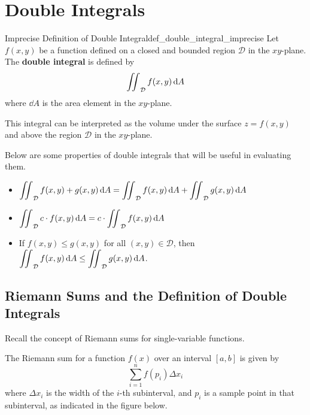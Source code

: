 \section{Double Integrals}
\begin{definition}{Imprecise Definition of Double Integral}{def_double_integral_imprecise}
Let $f(x, y)$ be a function defined on a closed and bounded region $\mathcal{D}$ in the $xy$-plane.
The \textbf{double integral} is defined by
\[
    \mathop{\int\mkern-10mu\int}\nolimits_{\mathcal{D}} f(x, y) \, \mathrm{d}A
\]
where $\dd{A}$ is the area element in the $xy$-plane.

This integral can be interpreted as the volume under the surface $z = f(x, y)$ and above the region $\mathcal{D}$ in the $xy$-plane.
\end{definition}

Below are some properties of double integrals that will be useful in evaluating them.
\begin{itemize}
    \item $\displaystyle\mathop{\int\mkern-10mu\int}\nolimits_{\mathcal{D}} f(x, y) + g(x, y) \, \mathrm{d}A = \mathop{\int\mkern-10mu\int}\nolimits_{\mathcal{D}} f(x, y) \, \mathrm{d}A + \mathop{\int\mkern-10mu\int}\nolimits_{\mathcal{D}} g(x, y) \, \mathrm{d}A$ \\[-0.5em]
    \item $\displaystyle\mathop{\int\mkern-10mu\int}\nolimits_{\mathcal{D}} c \cdot f(x, y) \, \mathrm{d}A = c \cdot \mathop{\int\mkern-10mu\int}\nolimits_{\mathcal{D}} f(x, y) \, \mathrm{d}A$ \\[-0.5em]
    \item If $f(x, y) \leq g(x, y)$ for all $(x, y) \in \mathcal{D}$, then $\displaystyle\mathop{\int\mkern-10mu\int}\nolimits_{\mathcal{D}} f(x, y) \, \mathrm{d}A \leq \mathop{\int\mkern-10mu\int}\nolimits_{\mathcal{D}} g(x, y) \, \mathrm{d}A$.
\end{itemize}

\subsection{Riemann Sums and the Definition of Double Integrals}
Recall the concept of Riemann sums for single-variable functions.

The Riemann sum for a function $f(x)$ over an interval $[a, b]$ is given by
\[
    \sum_{i=1}^n f(p_i) \Delta x_i
\]
where $\Delta x_i$ is the width of the $i$-th subinterval,
and $p_i$ is a sample point in that subinterval, as indicated in the figure below.
\begin{center}
\end{center}


